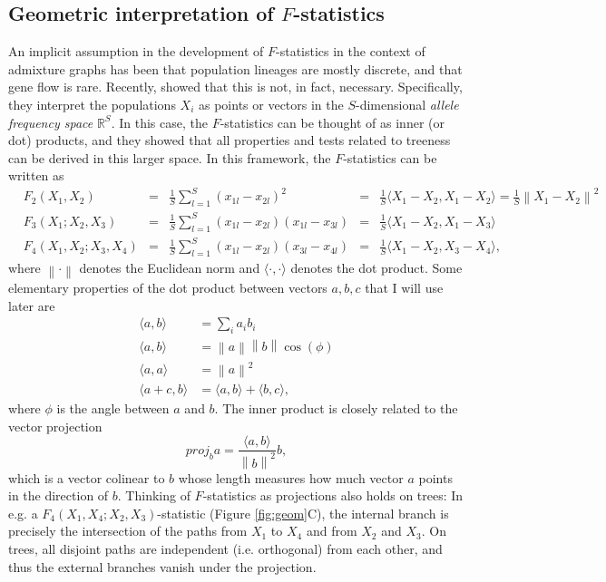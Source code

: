 \documentclass[12pt,fullpage, a4paper]{article}
\newcommand{\norm}[1]{\left\lVert#1\right\rVert}
\newcommand{\normsq}[1]{\left\lVert#1\right\rVert^2}
\newcommand{\vectorproj}[2][]{\textit{proj}_{#1}#2}
\begin{document}
\subsection{Geometric interpretation of $F$-statistics}
An implicit assumption in the development of $F$-statistics in the context of admixture graphs has been that population lineages are mostly discrete, and that gene flow is rare. Recently, \cite{oteo-garcia2021} showed that this is not, in fact, necessary. Specifically, they interpret the populations $X_i$ as points or vectors in the $S$-dimensional \emph{allele frequency space} $\mathbb{R}^S$. In this case, the $F$-statistics can be thought of as inner (or dot) products, and they showed that all properties and tests related to treeness can be derived in this larger space. In this framework, the $F$-statistics can be written as
\begin{subequations}
	\begin{align}
	&F_2(X_1, X_2) &=& \frac{1}{S}\sum_{l=1}^S(x_{1l} - x_{2l})^2
	&=& \frac{1}{S}\langle X_1 - X_2, X_1 - X_2 \rangle = \frac{1}{S}\normsq{X_1-  X_2}\\
	&F_3(X_1; X_2, X_3) &=& \frac{1}{S}\sum_{l=1}^S(x_{1l} - x_{2l})(x_{1l} - x_{3l}) &=& \frac{1}{S}\langle X_1 - X_2, X_1 - X_3 \rangle\\	
	&F_4(X_1, X_2; X_3, X_4) &=& \frac{1}{S}\sum_{l=1}^S(x_{1l} - x_{2l})(x_{3l} - x_{4l}) &=& \frac{1}{S}\langle X_1 - X_2, X_3 - X_4 \rangle	\text{,}
	\end{align}
\end{subequations}
where $\norm{\cdot}$ denotes the Euclidean norm and $\langle \cdot, \cdot \rangle$ denotes the dot product. Some elementary properties of the dot product between vectors $a, b, c$ that I will use later are
\begin{subequations}
	\begin{align}
	\langle a, b \rangle &= \sum_i a_ib_i\\
	\langle a, b \rangle &= \norm{a}\norm{b}\cos(\phi)\\
	\langle a, a \rangle &= \normsq{a}\\
	\langle a + c, b \rangle &= \langle a, b \rangle + \langle b, c \rangle,
	\end{align}
\end{subequations}
where $\phi$ is the angle between $a$ and $b$. The inner product is  closely related to the vector projection
\begin{equation}
\vectorproj[b]{a} = \frac{\langle a , b\rangle}{\normsq{b}} b,\label{eq:proj}
\end{equation}
which is a vector colinear to $b$ whose length measures how much vector $a$ points in the direction of $b$. Thinking of $F$-statistics as projections also holds on trees: In e.g. a $F_4(X_1, X_4; X_2, X_3)$-statistic (Figure \ref{fig:geom}C), the internal branch is precisely the intersection of the paths from $X_1$ to $X_4$ and from $X_2$ and $X_3$. On trees, all disjoint paths are independent (i.e. orthogonal) from each other, and thus the external branches vanish under the projection.
\end{document}
